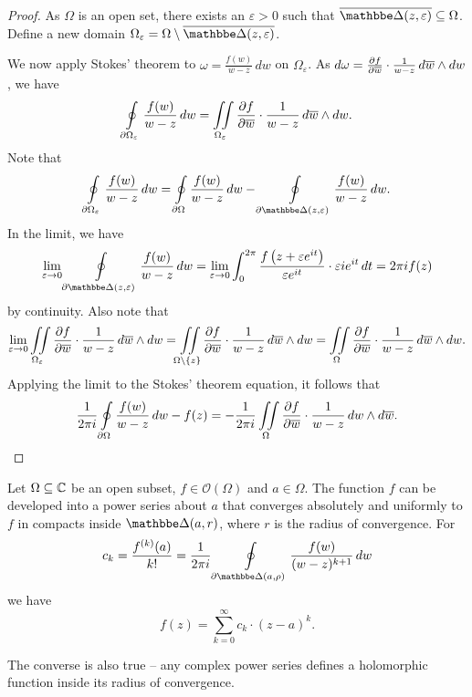 \begin{proof}
As $\Omega$ is an open set, there exists an $\varepsilon > 0$ such
that $\oline{\dsk(z, \varepsilon)} \subseteq \Omega$. Define a new
domain
$\Omega_\varepsilon =
\Omega \setminus \oline{\dsk(z, \varepsilon)}$.

We now apply Stokes' theorem to $\omega = \frac{f(w)}{w-z}\,dw$ on
$\Omega_\varepsilon$. As
$d\omega =
\frac{\partial f}{\partial \overline{w}} \cdot \frac{1}{w-z}\,d\overline{w} \wedge dw$, we
have
\[
\oint\limits_{\partial \Omega_\varepsilon} \frac{f(w)}{w-z}\,dw =
\iint\limits_{\Omega_\varepsilon} \frac{\partial f}{\partial \overline{w}} \cdot
\frac{1}{w-z}\,d\overline{w} \wedge dw.
\]
Note that
\[
\olint_{\partial \Omega_\varepsilon} \frac{f(w)}{w-z}\,dw =
\olint_{\partial \Omega} \frac{f(w)}{w-z}\,dw -
\olint_{\partial \dsk(z, \varepsilon)} \frac{f(w)}{w-z}\,dw.
\]
In the limit, we have
\[
\lim_{\varepsilon \to 0}
\olint_{\partial \dsk(z, \varepsilon)} \frac{f(w)}{w - z}\,dw =
\lim_{\varepsilon \to 0}
\int_0^{2 \pi}
\frac{f \br{z + \varepsilon e^{it}}}{\varepsilon e^{it}} \cdot
\varepsilon i e^{it}\,dt =
2 \pi i f(z)
\]
by continuity. Also note that
\[
\lim_{\varepsilon \to 0}
\iint\limits_{\Omega_\varepsilon} \frac{\partial f}{\partial \overline{w}} \cdot
\frac{1}{w-z}\,d\overline{w} \wedge dw =
\iint\limits_{\Omega \setminus \left\{z\right\}} \frac{\partial f}{\partial \overline{w}} \cdot
\frac{1}{w - z}\,d\overline{w} \wedge dw =
\iint\limits_{\Omega} \frac{\partial f}{\partial \overline{w}} \cdot
\frac{1}{w - z}\,d\overline{w} \wedge dw.
\]
Applying the limit to the Stokes' theorem equation, it follows that
\[
\frac{1}{2 \pi i}
\oint\limits_{\partial \Omega} \frac{f(w)}{w-z}\,dw - f(z) =
-\frac{1}{2 \pi i} \iint\limits_{\Omega} \frac{\partial f}{\partial \overline{w}} \cdot
\frac{1}{w-z}\,dw \wedge d\overline{w}. \qedhere
\]
\end{proof}

\begin{izrek}
Let $\Omega \subseteq \mathbb{C}$ be an open subset,
$f \in \mathcal{O}(\Omega)$ and $a \in \Omega$. The function $f$
can be developed into a power series about $a$ that converges
absolutely and uniformly to $f$ in compacts inside $\dsk(a, r)$,
where $r$ is the radius of convergence. For
\[
c_k = \frac{f^{(k)}(a)}{k!} =
\frac{1}{2 \pi i} \olint_{\partial \dsk(a, \rho)}
\frac{f(w)}{(w-z)^{k+1}}\,dw
\]
we have
\[
f(z) = \sum_{k=0}^\infty c_k \cdot (z-a)^k.
\]
\end{izrek}

\begin{opomba}
The converse is also true -- any complex power series defines a
holomorphic function inside its radius of convergence.
\end{opomba}

